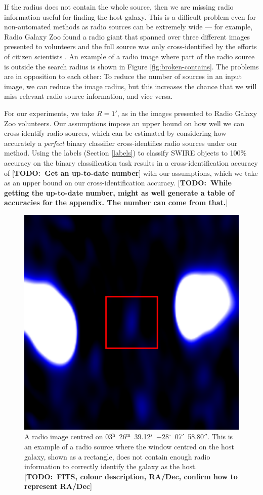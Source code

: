 \documentclass[fleqn,usenatbib,usedcolumn]{mnras}
\newcommand{\text}{\mathrm}
\newcommand{\todo}[1]{ {\color{red}[{\bf TODO:~{#1}}]} }
\begin{document}
    If the radius does not contain the whole source, then we are missing radio
    information useful for finding the host galaxy. This is a difficult problem
    even for non-automated methods as radio sources can be extremely wide ---
    for example, Radio Galaxy Zoo found a radio giant that spanned over three
    different images presented to volunteers and the full source was only
    cross-identified by the efforts of citizen scientists \citep{banfield15}. An
    example of a radio image where part of the radio source is outside the
    search radius is shown in Figure \ref{fig:broken-contains}. The problems are
    in opposition to each other: To reduce the number of sources in an input
    image, we can reduce the image radius, but this increases the chance that we
    will miss relevant radio source information, and vice versa.

    For our experiments, we take $R = 1'$, as in the images presented to Radio
    Galaxy Zoo volunteers. Our assumptions impose an upper bound on how well we
    can cross-identify radio sources, which can be estimated by considering how
    accurately a \emph{perfect} binary classifier cross-identifies radio sources
    under our method. Using the \citet{norris06} labels (Section \ref{labels})
    to classify SWIRE objects to 100\% accuracy on the binary classification
    task results in a cross-identification accuracy of \todo{Get an up-to-date
    number} with our assumptions, which we take as an upper bound on our
    cross-identification accuracy. \todo{While getting the up-to-date number,
    might as well generate a table of accuracies for the appendix. The number
    can come from that.}

    \begin{figure}
      \centering
      \includegraphics[width=0.5\linewidth]{images/ARG0003sky_radio.eps}
      \caption{A radio image centred on 03$^\text{h}$~26$^\text{m}$~39.12$^\text{s}$~$-$28$^\circ$~07$'$~58.80$''$.        %
        This is an example of a radio source where the window centred on the
        host galaxy, shown as a rectangle, does not contain enough radio
        information to correctly identify the galaxy as the host. \todo{FITS,
        colour description, RA/Dec, confirm how to represent RA/Dec}}
      \label{fig:broken-window-size}
    \end{figure}
\end{document}
